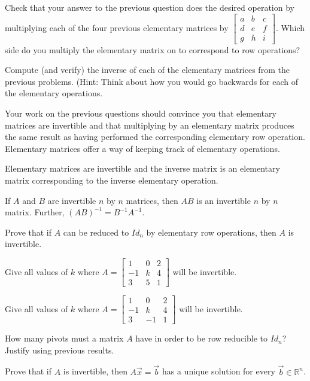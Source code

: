 \bq Check that your answer to the previous question does the desired operation by multiplying each of the four previous elementary matrices by $\begin{bmatrix} a&b&c\\d&e&f\\g&h&i \end{bmatrix}$. Which side do you multiply the elementary matrix on to correspond to row operations?
\eq

\bq Compute (and verify) the inverse of each of the elementary matrices from the previous problems. (Hint: Think about how you would go backwards for each of the elementary operations.
\eq

Your work on the previous questions should convince you that elementary matrices are invertible and that multiplying by an elementary matrix produces the same result as having performed the corresponding elementary row operation. Elementary matrices offer a way of keeping track of elementary operations.
\begin{theorem}
Elementary matrices are invertible and the inverse matrix is an elementary matrix corresponding to the inverse elementary operation.
\end{theorem}

\begin{theorem}
If $A$ and $B$ are invertible $n$ by $n$ matrices, then $AB$ is an invertible $n$ by $n$ matrix. Further, $(AB)^{-1} =B^{-1}A^{-1}$.
\end{theorem}

\bq\label{q11} Prove that if $A$ can be reduced to $Id_n$ by elementary row operations, then $A$ is invertible.
\eq

\bq Give all values of $k$ where $A=\begin{bmatrix} 1&0&2\\-1&k&4\\3&5&1 \end{bmatrix}$ will be invertible.
\eq

\bq Give all values of $k$ where $A=\begin{bmatrix} 1&0&2\\-1&k&4\\3&-1&1 \end{bmatrix}$ will be invertible.
\eq

\bq How many pivots must a matrix $A$ have in order to be row reducible to $Id_n$? Justify using previous results.
\eq

\bq Prove that if $A$ is invertible, then $A\vec{x} =\vec{b}$ has a unique solution for every $\vec{b} \in \mathbb{R}^n$.
\eq

